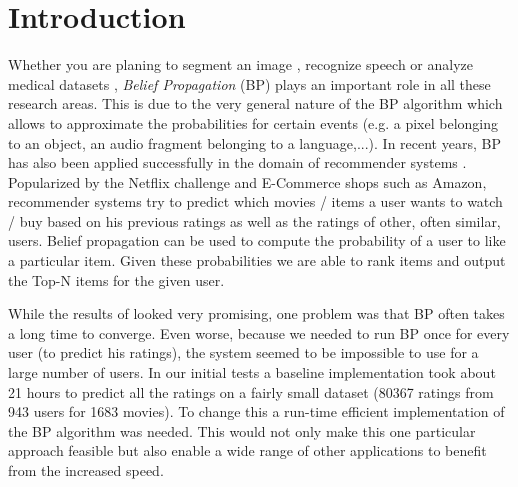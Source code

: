 
\section{Introduction}\label{sec:intro}

Whether you are planing to segment an image \cite{1544822}, recognize speech \cite{5373446} or analyze medical datasets \cite{bailly2011finding}, \textit{Belief Propagation} (BP) plays an important role in all these research areas. This is due to the very general nature of the BP algorithm which allows to approximate the probabilities for certain events (e.g. a pixel belonging to an object, an audio fragment belonging to a language,...). In recent years, BP has also been applied successfully in the domain of recommender systems \cite{Ha:2012:TRT:2396761.2398636}. Popularized by the Netflix challenge and E-Commerce shops such as Amazon, recommender systems try to predict which movies / items a user wants to watch / buy based on his previous ratings as well as the ratings of other, often similar, users. Belief propagation can be used to compute the probability of a user to like a particular item. Given these probabilities we are able to rank items and output the Top-N items for the given user.

 




While the results of \cite{Ha:2012:TRT:2396761.2398636} looked very promising, one problem was that BP often takes a long time to converge. Even worse, because we needed to run BP once for every user (to predict his ratings), the system seemed to be impossible to use for a large number of users. In our initial tests a baseline implementation took about 21 hours to predict all the ratings on a fairly small dataset (80367 ratings from 943 users for 1683 movies). To change this a run-time efficient implementation of the BP algorithm was needed.
This would not only make this one particular approach feasible but also enable a wide range of other applications to benefit from the increased speed.


